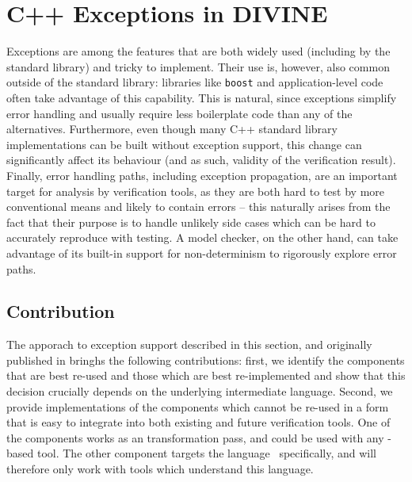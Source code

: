 \section{C++ Exceptions in DIVINE}\label{sec:lang:except}

Exceptions are among the features that are both widely used (including
by the standard library) and tricky to implement.
Their use is, however, also common outside of the standard library: libraries
like \texttt{boost} and application-level code often take advantage of this
capability.
This is natural, since exceptions simplify error handling and usually require
less boilerplate code than any of the alternatives.
Furthermore, even though many C++ standard library implementations can
be built without exception support, this change can significantly affect its behaviour
(and as such, validity of the verification result).
Finally, error handling paths, including exception propagation, are an
important target for analysis by verification tools, as they are both hard to
test by more conventional means and likely to contain errors -- this naturally
arises from the fact that their purpose is to handle unlikely side cases which
can be hard to accurately reproduce with testing.
A model checker, on the other hand, can take advantage of its built-in support
for non-determinism to rigorously explore error paths.

\subsection{Contribution}\label{contribution}

The apporach to exception support described in this section, and originally published in  bringhs the following contributions:
first, we identify the
components that are best re-used and those which are best re-implemented
and show that this decision crucially depends on the underlying
intermediate language. Second, we provide implementations of the
components which cannot be re-used in a form that is easy to integrate
into both existing and future verification tools. One of the components
works as an \llvm{} transformation pass, and could be used with any
\llvm{}-based tool. The other component targets the \divm{}
language~ specifically, and will therefore only
work with tools which understand this language.

